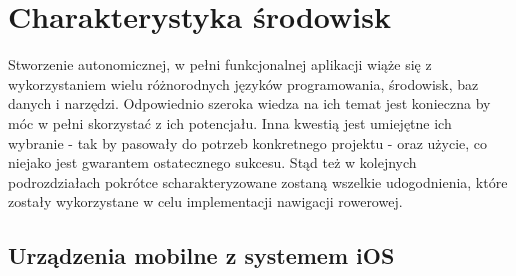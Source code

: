 \chapter{Charakterystyka środowisk}
\label{cha:charakterystyka_srodowisk}

Stworzenie autonomicznej, w pełni funkcjonalnej aplikacji wiąże się z wykorzystaniem wielu różnorodnych języków programowania, środowisk, baz danych i narzędzi. Odpowiednio szeroka wiedza na ich temat jest konieczna by móc w pełni skorzystać z ich potencjału. Inna kwestią jest umiejętne ich wybranie - tak by pasowały do potrzeb konkretnego projektu - oraz użycie, co niejako jest gwarantem ostatecznego sukcesu. Stąd też w kolejnych podrozdziałach pokrótce scharakteryzowane zostaną wszelkie udogodnienia, które zostały wykorzystane w celu implementacji nawigacji rowerowej. 

\section{Urządzenia mobilne z systemem iOS}

